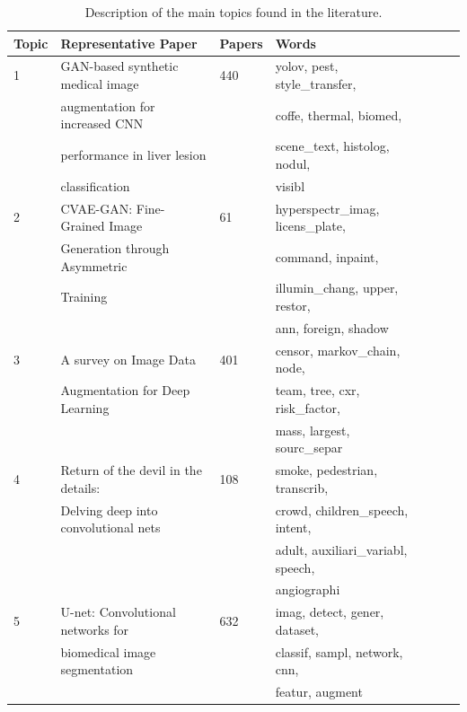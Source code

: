 \documentclass[pdflatex,sn-mathphys]{sn-jnl}%
\theoremstyle{thmstyleone}
\theoremstyle{thmstyletwo}
\theoremstyle{thmstylethree}
\begin{document}
\begin{table}[ht]
    \begin{center}
    \caption{\label{tab:topic_analysis}
        Description of the main topics found in the literature.
    }
    \begin{tabular*}{\textwidth}{@{\extracolsep{\fill}}lllllll@{\extracolsep{\fill}}}
        \toprule
        Topic & Representative Paper & Papers & Words\\
        \midrule
        1 & GAN-based synthetic medical image & 440 & yolov, pest, style\_transfer, \\
          & augmentation for increased CNN && coffe, thermal, biomed, \\
          & performance in liver lesion && scene\_text, histolog, nodul, \\
        \vspace{.2cm}& classification && visibl \\
        
        2 & CVAE-GAN: Fine-Grained Image & 61 & hyperspectr\_imag, licens\_plate, \\
          & Generation through Asymmetric && command, inpaint, \\
          & Training && illumin\_chang, upper, restor, \\
        \vspace{.2cm}  &&& ann, foreign, shadow \\
        
        3 & A survey on Image Data & 401 & censor, markov\_chain, node, \\ 
          & Augmentation for Deep Learning && team, tree, cxr, risk\_factor, \\
        \vspace{.2cm}  &&&mass, largest, sourc\_separ\\
        
        4 & Return of the devil in the details: & 108 & smoke, pedestrian, transcrib, \\
          & Delving deep into convolutional nets && crowd, children\_speech, intent, \\
          &&&adult, auxiliari\_variabl, speech, \\
        \vspace{.2cm}  &&&angiographi \\
        
        5 & U-net: Convolutional networks for & 632 & imag, detect, gener, dataset, \\
          & biomedical image segmentation && classif, sampl, network, cnn, \\
        \vspace{.2cm}  &&&featur, augment\\
        

\end{tabular*}
\end{center}
\end{table}
\end{document}
